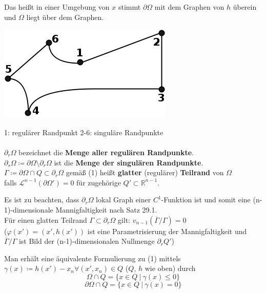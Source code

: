 \begin{definition}
       
    Das heißt in einer Umgebung von $x$ stimmt $\partial \Omega $ mit dem Graphen von $h$
    überein und $\Omega$ liegt über dem Graphen.
    \begin{center}
    \includegraphics[scale=0.5]{pictures/007-02a}
    \end{center}
    1: regulärer Randpunkt
    2-6: singuläre Randpunkte\\
    \mbox{}\\
    $\partial_r \Omega $ bezeichnet die \textbf{Menge aller regulären Randpunkte}. \\
    $\partial_s \Omega \coloneqq \partial \Omega \setminus \partial_r \Omega $ ist die 
    \textbf{Menge der singulären Randpunkte}. \\
    $\Gamma \coloneqq \partial \Omega \cap Q \subset \partial_r \Omega $
    gemäß (1) heißt \textbf{glatter} (regulärer) \textbf{Teilrand} von $\Omega$ \\
    falls $\mathcal{L}^{n-1} (\partial \Omega') = 0 $
    für zugehörige $Q' \subset \mathbb{R}^{n-1} $.
\end{definition}    
    
Es ist zu beachten, dass $\partial_r \Omega $ lokal Graph einer
$C^1$-Funktion ist und somit eine (n-1)-dimensionale Mannigfaltigkeit nach Satz 29.1. \\
Für einen glatten Teilrand $\Gamma \subset \partial_r \Omega $ gilt:
$v_{n-1} \left(\overline{\Gamma} / \Gamma \right) = 0 $\\
($\varphi \left(x' \right) = \left(x', h\left(x' \right) \right)
$ ist eine Parametrisierung der Mannigfaltigkeit und \\
$\overline{\Gamma} / \Gamma 
$ ist Bild der (n-1)-dimensionalen Nullmenge $
\partial_r Q' $)

Man erhält eine äquivalente Formulierung zu (1) mittels \\
$\gamma(x) \coloneqq h(x') - x_n \forall (x', x_n) \in Q $ ($Q$, $h$ wie oben) durch
\begin{equation*}
    \Omega \cap Q = \lbrace x \in Q \ |\ \gamma(x) \leq 0 \rbrace
\end{equation*}
\begin{equation}
    \partial \Omega \cap Q = \lbrace x \in Q \ |\ \gamma(x) = 0 \rbrace
\end{equation}

